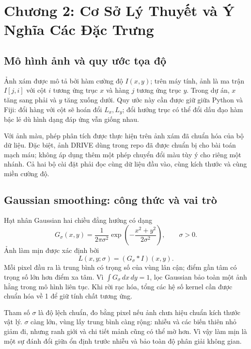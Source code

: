 \section{Chương 2: Cơ Sở Lý Thuyết và Ý Nghĩa Các Đặc Trưng}
\subsection{Mô hình ảnh và quy ước tọa độ}
Ảnh xám được mô tả bởi hàm cường độ $I(x,y)$; trên máy tính, ảnh là ma trận $I[j,i]$ với cột $i$ tương ứng trục $x$ và hàng $j$ tương ứng trục $y$. Trong dự án, $x$ tăng sang phải và $y$ tăng xuống dưới. Quy ước này cần được giữ giữa Python và Fiji: đổi hàng với cột sẽ hoán đổi $L_x,L_y$; đổi hướng trục có thể đổi dấu đạo hàm bậc lẻ dù hình dạng đáp ứng vẫn giống nhau.

Với ảnh màu, phép phân tích được thực hiện trên ảnh xám đã chuẩn hóa của bộ dữ liệu. Đặc biệt, ảnh DRIVE dùng trong repo đã được chuẩn bị cho bài toán mạch máu; không áp dụng thêm một phép chuyển đổi màu tùy ý cho riêng một nhánh. Cả hai bộ cài đặt phải đọc cùng dữ liệu đầu vào, cùng kích thước và cùng miền cường độ.

\subsection{Gaussian smoothing: công thức và vai trò}
Hạt nhân Gaussian hai chiều đẳng hướng có dạng
\begin{equation}
G_\sigma(x,y)=\frac{1}{2\pi\sigma^2}
\exp\left(-\frac{x^2+y^2}{2\sigma^2}\right),\qquad \sigma>0.
\label{eq:gaussian2d}
\end{equation}
Ảnh làm mịn được xác định bởi
\begin{equation}
L(x,y;\sigma)=(G_\sigma*I)(x,y).
\label{eq:scalespace}
\end{equation}
Mỗi pixel đầu ra là trung bình có trọng số của vùng lân cận; điểm gần tâm có trọng số lớn hơn điểm xa tâm. Vì $\int G_\sigma\,dx\,dy=1$, lọc Gaussian bảo toàn một ảnh hằng trong mô hình liên tục. Khi rời rạc hóa, tổng các hệ số kernel cần được chuẩn hóa về 1 để giữ tính chất tương ứng.

Tham số $\sigma$ là độ lệch chuẩn, đo bằng pixel nếu ảnh chưa hiệu chuẩn kích thước vật lý. $\sigma$ càng lớn, vùng lấy trung bình càng rộng: nhiễu và các biến thiên nhỏ giảm đi, nhưng ranh giới và chi tiết mảnh cũng có thể mờ hơn. Vì vậy làm mịn là một sự đánh đổi giữa ổn định trước nhiễu và bảo toàn độ phân giải không gian.


